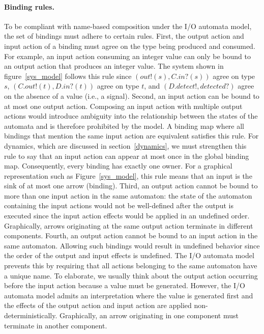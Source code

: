\paragraph{Binding rules.}
To be compliant with name-based composition under the I/O automata model, the set of bindings must adhere to certain rules.
First, the output action and input action of a binding must agree on the type being produced and consumed.
For example, an input action consuming an integer value can only be bound to an output action that produces an integer value.
The system shown in figure~\ref{sys_model} follows this rule since $(out!(s), C.in?(s))$ agree on type $s$, $(C.out!(t), D.in?(t))$ agree on type $t$, and $(D.detect!, detected?)$ agree on the absence of a value (i.e., a signal).
Second, an input action can be bound to at most one output action.
Composing an input action with multiple output actions would introduce ambiguity into the relationship between the states of the automata and is therefore prohibited by the model.
A binding map where all bindings that mention the same input action are equivalent satisfies this rule.
For dynamics, which are discussed in section~\ref{dynamics}, we must strengthen this rule to say that an input action can appear at most once in the global binding map.
Consequently, every binding has exactly one owner.
For a graphical representation such as Figure~\ref{sys_model}, this rule means that an input is the sink of at most one arrow (binding).
Third, an output action cannot be bound to more than one input action in the same automaton:  the state of the automaton containing the input actions would not be well-defined after the output is executed since the input action effects would be applied in an undefined order.
Graphically, arrows originating at the same output action terminate in different components.
Fourth, an output action cannot be bound to an input action in the same automaton.
Allowing such bindings would result in undefined behavior since the order of the output and input effects is undefined.
The I/O automata model prevents this by requiring that all actions belonging to the same automaton have a unique name.
To elaborate, we usually think about the output action occurring before the input action because a value must be generated.
However, the I/O automata model admits an interpretation where the value is generated first and the effects of the output action and input action are applied non-deterministically.
Graphically, an arrow originating in one component must terminate in another component.

